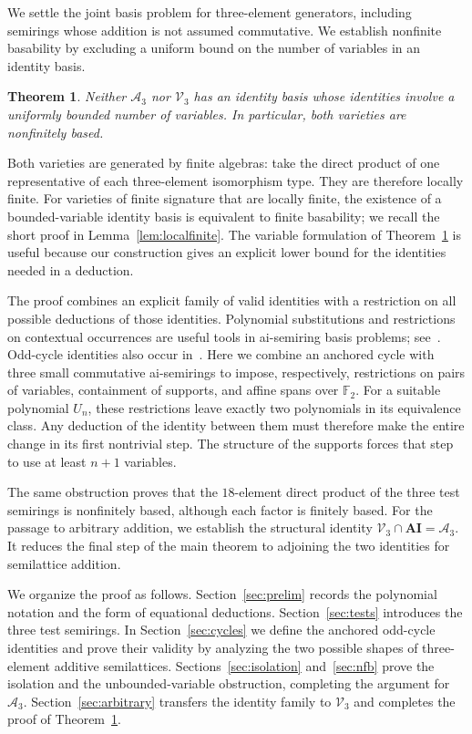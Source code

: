 \documentclass[11pt,reqno]{amsart}
\numberwithin{equation}{section}
\newtheorem{theorem}{Theorem}[section]
\theoremstyle{definition}
\theoremstyle{remark}
\newcommand{\AI}{\mathbf{AI}}
\newcommand{\Vthree}{\mathcal V_3}
\newcommand{\Athree}{\mathcal A_3}
\newcommand{\F}{\mathbb F_2}
\begin{document}
We settle the joint basis problem for three-element generators,
including semirings whose addition is not assumed commutative.
We establish nonfinite basability by excluding a uniform bound on
the number of variables in an identity basis.

\begin{theorem}\label{thm:main}
Neither $\Athree$ nor $\Vthree$ has an identity basis whose identities
involve a uniformly bounded number of variables. In particular, both
varieties are nonfinitely based.
\end{theorem}

Both varieties are generated by finite algebras: take the direct
product of one representative of each three-element isomorphism type.
They are therefore locally finite. For varieties of finite signature
that are locally finite, the existence of a bounded-variable identity
basis is equivalent to finite basability; we recall the short proof
in Lemma~\ref{lem:localfinite}. The variable formulation of
Theorem~\ref{thm:main} is useful because our construction gives an
explicit lower bound for the identities needed in a deduction.

The proof combines an explicit family of valid identities with a
restriction on all possible deductions of those identities. Polynomial
substitutions and restrictions on contextual occurrences are useful
tools in ai-semiring basis problems; see~\cite{JRZ,YRG}.
Odd-cycle identities also occur in~\cite{ShaoRenGao2026}.
Here we combine an anchored cycle with
three small commutative ai-semirings to impose, respectively, restrictions
on pairs of variables, containment of supports, and affine spans over
$\F$. For a suitable polynomial $U_n$, these restrictions leave exactly
two polynomials in its equivalence class. Any deduction of the identity
between them must therefore make the entire change in its first
nontrivial step. The structure of the supports forces that step to
use at least $n+1$ variables.

The same obstruction proves that the $18$-element direct product of
the three test semirings is nonfinitely based, although each factor
is finitely based. For the passage to arbitrary addition, we establish
the structural identity
$\Vthree\cap\AI=\Athree$. It reduces the final step of the main
theorem to adjoining the two identities for semilattice addition.

We organize the proof as follows. Section~\ref{sec:prelim} records the
polynomial notation and the form of equational deductions.
Section~\ref{sec:tests} introduces the three test semirings.
In Section~\ref{sec:cycles} we define the anchored odd-cycle identities
and prove their validity by analyzing the two possible shapes of
three-element additive semilattices. Sections~\ref{sec:isolation}
and~\ref{sec:nfb} prove the
isolation and the unbounded-variable obstruction, completing the
argument for $\Athree$. Section~\ref{sec:arbitrary} transfers the
identity family to $\Vthree$ and completes the proof of
Theorem~\ref{thm:main}.
\end{document}
